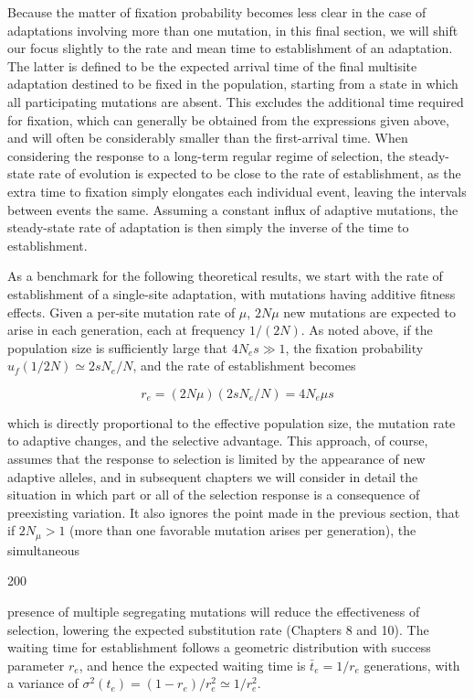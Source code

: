 \documentclass{article}
\begin{document}
Because the matter of fixation probability becomes less clear in the case of adaptations involving more than one mutation, in this final section, we will shift our focus slightly to the rate and mean time to establishment of an adaptation. The latter is defined to be the expected arrival time of the final multisite adaptation destined to be fixed in the population, starting from a state in which all participating mutations are absent. This excludes the additional time required for fixation, which can generally be obtained from the expressions given above, and will often be considerably smaller than the first-arrival time. When considering the response to a long-term regular regime of selection, the steady-state rate of evolution is expected to be close to the rate of establishment, as the extra time to fixation simply elongates each individual event, leaving the intervals between events the same. Assuming a constant influx of adaptive mutations, the steady-state rate of adaptation is then simply the inverse of the time to establishment.

As a benchmark for the following theoretical results, we start with the rate of establishment of a single-site adaptation, with mutations having additive fitness effects. Given a per-site mutation rate of  $ \mu $,  $ 2N\mu $ new mutations are expected to arise in each generation, each at frequency  $ 1/(2N) $. As noted above, if the population size is sufficiently large that  $ 4N_{e}s \gg 1 $, the fixation probability  $ u_{f}(1/2N) \simeq 2sN_{e}/N $, and the rate of establishment becomes

\begin{equation}
r_{e}=(2N\mu)(2s N_{e}/N)=4N_{e}\mu s
\tag{7.44}
\label{eq:7_44}
\end{equation}

which is directly proportional to the effective population size, the mutation rate to adaptive changes, and the selective advantage. This approach, of course, assumes that the response to selection is limited by the appearance of new adaptive alleles, and in subsequent chapters we will consider in detail the situation in which part or all of the selection response is a consequence of preexisting variation. It also ignores the point made in the previous section, that if  $ 2N_{\mu} > 1 $ (more than one favorable mutation arises per generation), the simultaneous

200

presence of multiple segregating mutations will reduce the effectiveness of selection, lowering the expected substitution rate (Chapters 8 and 10). The waiting time for establishment follows a geometric distribution with success parameter  $ r_e $, and hence the expected waiting time is  $ \bar{t}_e = 1/r_e $ generations, with a variance of  $ \sigma^2(t_e) = (1 - r_e)/r_e^2 \simeq 1/r_e^2 $.
\end{document}
